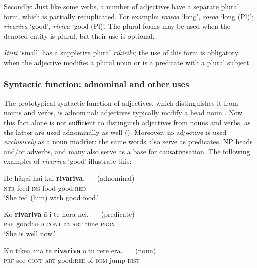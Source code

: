 Secondly: Just like some verbs, a number of adjectives have a separate plural form, which is partially reduplicated. For example: \textit{roaroa} ‘long’, \textit{roroa} ‘long (Pl)’; \textit{rivariva} ‘good’, \textit{ririva} ‘good (Pl)’. The plural forms may be used when the denoted entity is plural, but their use is optional. 

\textit{{\ꞌ}Iti{\ꞌ}iti} ‘small’ has a suppletive plural \textit{rikiriki}; the use of this form is obligatory when the adjective modifies a plural noun or is a predicate with a plural subject.

\subsubsection[Syntactic function: adnominal and other uses]{Syntactic function: adnominal and other uses}\label{sec:3.5.1.3}

The prototypical syntactic function of adjectives, which distinguishes it from nouns and verbs, is adnominal: adjectives typically modify a head noun \citep{Croft2000}. Now this fact alone is not sufficient to distinguish adjectives from nouns and verbs, as the latter are used adnominally as well (). Moreover, no adjective is used \textit{exclusively} as a noun modifier: the same words also serve as predicates, NP heads and/or adverbs, and many also serve as a base for causativisation. The following examples of \textit{rivariva} ‘good’ illustrate this:

\ea\label{ex:3.92}
\gll He hāŋai hai kai \textbf{rivariva}. ~~~\textup{(adnominal)}\\
\textsc{ntr} feed \textsc{ins} food good:\textsc{red} \\

\glt 
‘She fed (him) with good food.’ \textstyleExampleref{[Mtx-7-26.030]}
\z

\ea\label{ex:3.93}
\gll Ko \textbf{rivariva} {\ꞌ}ā {\ꞌ}i te hora nei. ~~~\textup{(predicate)}\\
\textsc{prf} good:\textsc{red} \textsc{cont} at \textsc{art} time \textsc{prox} \\

\glt 
‘She is well now.’ \textstyleExampleref{[R103.234]} 
\z

\ea\label{ex:3.94}
\gll Ku tike{\ꞌ}a {\ꞌ}ana te \textbf{rivariva} o tū rere era. ~~~\textup{(noun)}\\
\textsc{prf} see \textsc{cont} \textsc{art} good:\textsc{red} of \textsc{dem} jump \textsc{dist} \\

